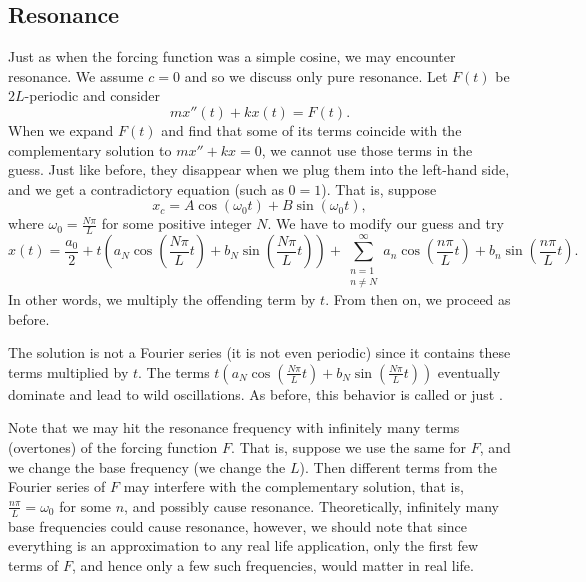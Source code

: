 \subsection{Resonance}

Just as when the forcing function was a simple cosine, we may encounter
resonance.  We assume $c=0$ and so we discuss only pure resonance.
Let $F(t)$ be $2L$-periodic and consider
\begin{equation*}
m x''(t) + k x (t) = F(t) .
\end{equation*}
When we expand $F(t)$ and find that some of its terms coincide with the
complementary solution to $mx''+kx=0$, we cannot use those terms in the
guess.  Just like before, they disappear when we plug them into the left-hand
side, and we get a contradictory equation (such as $0=1$).   That is,
suppose
\begin{equation*}
x_c = A \cos (\omega_0 t) + B \sin (\omega_0 t), 
\end{equation*}
where $\omega_0 = \frac{N \pi}{L}$ for some positive integer $N$.
We have
to modify our guess and try
\begin{equation*}
x(t) = \frac{a_0}{2} +
t \left(
a_N \cos \left( \frac{N \pi}{L} t \right) +
b_N \sin \left( \frac{N \pi}{L} t \right) \right) +
\sum_{\substack{n=1\\n\not= N}}^\infty
a_n \cos \left( \frac{n \pi}{L} t \right) +
b_n \sin \left( \frac{n \pi}{L} t \right) .
\end{equation*}
In other words, we multiply the offending term by $t$.  From then on, we
proceed as before.

The solution is not a Fourier series (it is not even
periodic) since it contains these terms multiplied by $t$.
The terms
$t \left( a_N \cos \left( \frac{N \pi}{L} t \right) +
b_N \sin \left( \frac{N \pi}{L} t \right) \right)$ eventually dominate and lead to
wild oscillations.  As before, this behavior is called \emph{} or just \emph{}.

Note that we may hit the resonance frequency with infinitely
many terms (overtones) of the forcing function $F$.
That is, suppose we use the same  for $F$, and we change the
base frequency (we change the $L$).
Then different
terms from the Fourier series of $F$ may interfere with the complementary
solution, that is, $\frac{n \pi}{L} = \omega_0$ for some $n$, and possibly
cause resonance.
Theoretically, infinitely many base frequencies
could cause resonance,
however, we should note that since everything is an approximation to
any real life application,
only the first
few terms of $F$, and hence only a few such frequencies,
would matter in real life.

